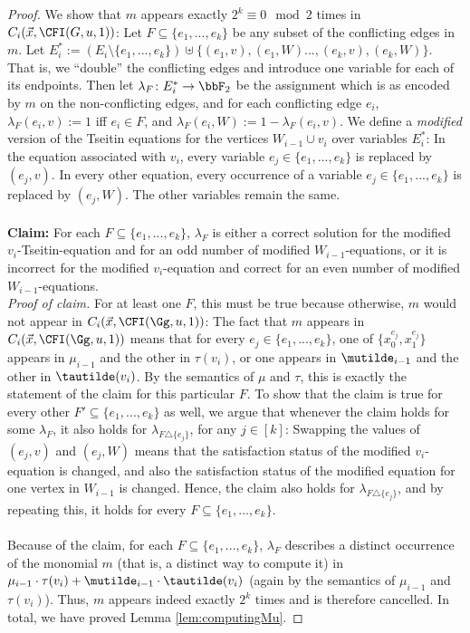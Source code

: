 \documentclass[a4paper,UKenglish,cleveref, autoref, thm-restate]{lipics-v2021}
\begin{document}
\begin{proof}
	We show that $m$ appears exactly $2^k \equiv 0 \mod 2$ times in $C_i(\vec x, \CFI(G, u, 1))$: Let $F \subseteq \{e_1,...,e_k\}$ be any subset of the conflicting edges in $m$. Let $E^*_i := (E_i \setminus \{e_1,..., e_k \} )\uplus \{  (e_1,v), (e_1,W)..., (e_k, v), (e_k, W) \}$. That is, we ``double'' the conflicting edges and introduce one variable for each of its endpoints. Then let $\lambda_F \colon E^*_i \to \bbF_2$ be the assignment which is as encoded by $m$ on the non-conflicting edges, and for each conflicting edge $e_i$, $\lambda_F(e_i,v) := 1$ iff $e_i \in F$, and $\lambda_F(e_i,W) := 1-\lambda_F(e_i,v)$. We define a \emph{modified} version of the Tseitin equations for the vertices $W_{i-1} \cup v_i$ over variables $E_i^*$: In the equation associated with $v_i$, every variable $e_j \in \{e_1,...,e_k\}$ is replaced by $(e_j,v)$. In every other equation, every occurrence of a variable $e_j \in \{e_1,...,e_k\}$ is replaced by $(e_j,W)$. The other variables remain the same.\\
	\\
	\textbf{Claim:} For each $F \subseteq \{e_1,...,e_k\}$, $\lambda_F$ is either a correct solution for the modified $v_i$-Tseitin-equation and for an odd number of modified $W_{i-1}$-equations, or it is incorrect for the modified $v_i$-equation and correct for an even number of modified $W_{i-1}$-equations.\\
	\textit{Proof of claim.} For at least one $F$, this must be true because otherwise, $m$ would not appear in $C_i(\vec x, \CFI(\Gg, u, 1))$: The fact that $m$ appears in $C_i(\vec x, \CFI(\Gg, u, 1))$ means that for every $e_j \in \{e_1,...,e_k\}$, one of $\{x_0^{e_j}, x_1^{e_j}\}$ appears in $\mu_{i-1}$ and the other in $\tau(v_i)$, or one appears in $\mutilde_{i-1}$ and the other in $\tautilde(v_i)$. By the semantics of $\mu$ and $\tau$, this is exactly the statement of the claim for this particular $F$. To show that the claim is true for every other $F' \subseteq \{e_1,...,e_k\}$ as well, we argue that whenever the claim holds for some $\lambda_F$, it also holds for $\lambda_{F \triangle \{e_j\}}$, for any $j \in [k]$: Swapping the values of $(e_j, v)$ and $(e_j, W)$ means that the satisfaction status of the modified $v_i$-equation is changed, and also the satisfaction status of the modified equation for one vertex in $W_{i-1}$ is changed. Hence, the claim also holds for $\lambda_{F \triangle \{e_j\}}$, and by repeating this, it holds for every $F \subseteq \{e_1,...,e_k\}$. \qedsymbol \\
	\\
	Because of the claim, for each $F \subseteq  \{e_1,...,e_k\}$, $\lambda_F$ describes a distinct occurrence of the monomial $m$ (that is, a distinct way to compute it) in $\mu_{i-1} \cdot \tau(v_i) + \mutilde_{i-1} \cdot \tautilde(v_i)$ (again by the semantics of $\mu_{i-1}$ and $\tau(v_i)$). Thus, $m$ appears indeed exactly $2^k$ times and is therefore cancelled.
	In total, we have proved Lemma \ref{lem:computingMu}.
\end{proof}
\end{document}
